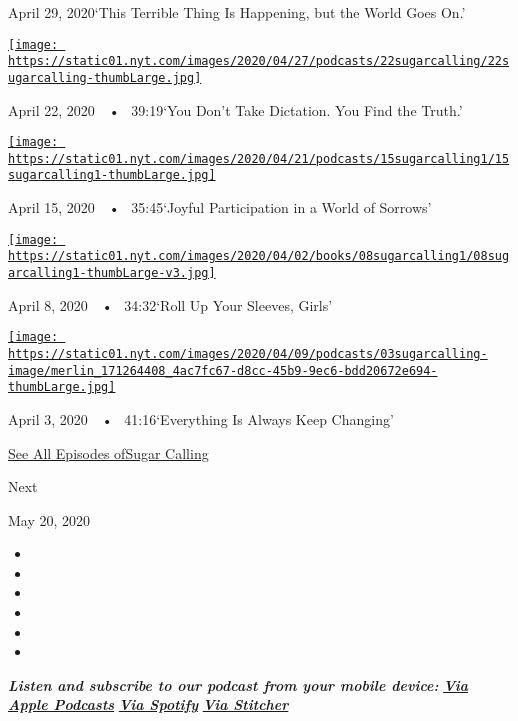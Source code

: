 April 29, 2020`This Terrible Thing Is Happening, but the World Goes On.'

\href{https://www.nytimes.com/2020/04/22/podcasts/sugar-calling-amy-tan-quarantine-virus.html?action=click\&module=audio-series-bar\&region=header\&pgtype=Article}{\texttt{[image: https://static01.nyt.com/images/2020/04/27/podcasts/22sugarcalling/22sugarcalling-thumbLarge.jpg]}}

April 22, 2020~~•~ 39:19`You Don't Take Dictation. You Find the Truth.'

\href{https://www.nytimes.com/2020/04/15/podcasts/sugar-calling-pico-iyer-coronavirus.html?action=click\&module=audio-series-bar\&region=header\&pgtype=Article}{\texttt{[image: https://static01.nyt.com/images/2020/04/21/podcasts/15sugarcalling1/15sugarcalling1-thumbLarge.jpg]}}

April 15, 2020~~•~ 35:45`Joyful Participation in a World of Sorrows'

\href{https://www.nytimes.com/2020/04/08/podcasts/sugar-calling-margaret-atwood-coronavirus.html?action=click\&module=audio-series-bar\&region=header\&pgtype=Article}{\texttt{[image: https://static01.nyt.com/images/2020/04/02/books/08sugarcalling1/08sugarcalling1-thumbLarge-v3.jpg]}}

April 8, 2020~~•~ 34:32`Roll Up Your Sleeves, Girls'

\href{https://www.nytimes.com/2020/04/03/podcasts/sugar-calling-george-saunders-coronavirus.html?action=click\&module=audio-series-bar\&region=header\&pgtype=Article}{\texttt{[image: https://static01.nyt.com/images/2020/04/09/podcasts/03sugarcalling-image/merlin\_171264408\_4ac7fc67-d8cc-45b9-9ec6-bdd20672e694-thumbLarge.jpg]}}

April 3, 2020~~•~ 41:16`Everything Is Always Keep Changing'

\href{https://www.nytimes.com/column/sugar-calling}{See All Episodes
ofSugar Calling}

Next

May 20, 2020

\begin{itemize}
\item
\item
\item
\item
\item
\item
\end{itemize}

\emph{\textbf{Listen and subscribe to our podcast from your mobile
device:}}
\textbf{\href{https://podcasts.apple.com/us/podcast/sugar-calling/id1505881384}{\emph{Via
Apple Podcasts}}} \emph{\textbf{\textbar{}}}
\textbf{\href{https://open.spotify.com/show/4U8hPiNGIBvTS9zLeiDCN7?si=gRyigD47SPWl-QWgNjgt2w}{\emph{Via
Spotify}}} \emph{\textbf{\textbar{}}}
\textbf{\href{https://www.stitcher.com/podcast/the-new-york-times/sugar-calling}{\emph{Via
Stitcher}}}

